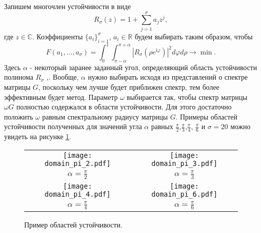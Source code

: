 \documentclass[a4paper, 14pt]{extreport} %
\begin{document}
Запишем многочлен устойчивости в виде
 $$R_{\sigma}(z)=1+\sum_{j=1}^\sigma a_jz^j,$$
где $z \in \mathbb{C}$. Коэффициенты $\{a_i\}_{i=1}^\sigma$, $a_i\in \mathbb{R}$ будем выбирать таким образом, чтобы
\begin{equation}
\label{minimizeR}
F(a_1,...,a_\sigma)=\int_0^1\int_{\pi-\alpha}^{\pi+\alpha}|R_\sigma(\rho e^{\mathrm i\varphi})|^2d\varphi
d\rho\longrightarrow \min.
\end{equation}
Здесь $\alpha$ - некоторый заранее заданный угол, определяющий область устойчивости полинома $R_\sigma$ \cite{Faleichik_article},\cite{Faleichik_bondar_amade}. Вообще, $\alpha$ нужно выбирать исходя из представлений о спектре матрицы $G$, поскольку чем лучше будет приближен спектр, тем более эффективным будет метод. Параметр $\omega$ выбирается так, чтобы спектр матрицы $\omega G$ полностью содержался в области устойчивости. Для этого достаточно положить $\omega$ равным спектральному радиусу матрицы $G$. Примеры областей устойчивости полученных для значений угла $\alpha$ равных $\frac{\pi}{2}$,$\frac{\pi}{3}$,$\frac{\pi}{4}$,  $\frac{\pi}{6}$ и $\sigma = 20$ можно увидеть на рисунке \ref{domains}.
\begin{figure}
\begin{center}
\begin{tabular}{cc}
\texttt{[image: domain\_pi\_2.pdf]}&\texttt{[image: domain\_pi\_3.pdf]}\\
\small{  $\alpha=\frac{\pi}{2}$} & \small{ $\alpha=\frac{\pi}{3}$}\\
\texttt{[image: domain\_pi\_4.pdf]}&\texttt{[image: domain\_pi\_6.pdf]}\\
\small{ $\alpha=\frac{\pi}{4}$} &\small{ $\alpha=\frac{\pi}{6}$}
\end{tabular}
\caption{\small Пример областей устойчивости. }
\label{domains}
\end{center}
\end{figure}
\end{document}
